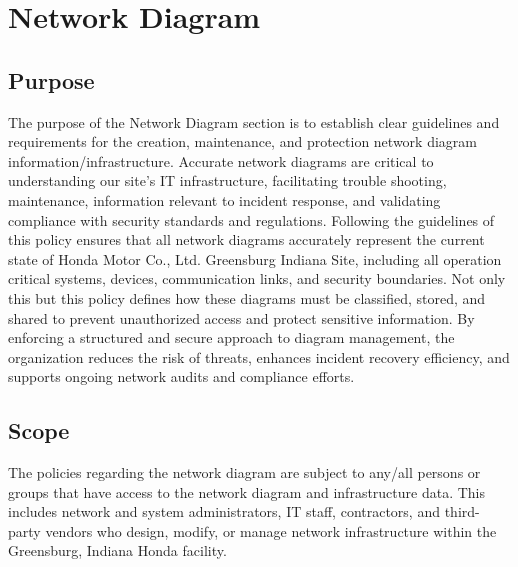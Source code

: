 \chapter{Network Diagram}
\pagestyle{fancy}

\fancyhf{}

\fancyfoot[C]{\thepage}

\renewcommand{\headrulewidth}{0pt}
\renewcommand{\footrulewidth}{0pt}

\section{Purpose}
The purpose of the Network Diagram section is to establish clear guidelines and requirements for the creation, maintenance, and protection network diagram information/infrastructure. Accurate network diagrams are critical to understanding our site's IT infrastructure, facilitating trouble shooting, maintenance, information relevant to incident response, and validating compliance with security standards and regulations. Following the guidelines of this policy ensures that all network diagrams accurately represent the current state of Honda Motor Co., Ltd. Greensburg Indiana Site, including all operation critical systems, devices, communication links, and security boundaries. Not only this but this policy defines how these diagrams must be classified, stored, and shared to prevent unauthorized access and protect sensitive information. By enforcing a structured and secure approach to diagram management, the organization reduces the risk of threats, enhances incident recovery efficiency, and supports ongoing network audits and compliance efforts.
\section{Scope}
The policies regarding the network diagram are subject to any/all persons or groups that have access to the network diagram and infrastructure data. This includes network and system administrators, IT staff, contractors, and third-party vendors who design, modify, or manage network infrastructure within the Greensburg, Indiana Honda facility.

